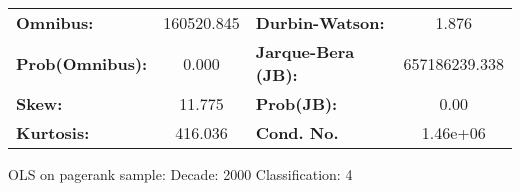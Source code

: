 \begin{center}
\begin{tabular}{lccccc}
\bottomrule
\end{tabular}
\begin{tabular}{lclc}
\textbf{Omnibus:}       & 160520.845 & \textbf{  Durbin-Watson:     } &       1.876    \\
\textbf{Prob(Omnibus):} &    0.000   & \textbf{  Jarque-Bera (JB):  } & 657186239.338  \\
\textbf{Skew:}          &   11.775   & \textbf{  Prob(JB):          } &        0.00    \\
\textbf{Kurtosis:}      &  416.036   & \textbf{  Cond. No.          } &    1.46e+06    \\
\bottomrule
\end{tabular}
\end{center}
\break
OLS on pagerank sample: Decade: 2000 Classification: 4
